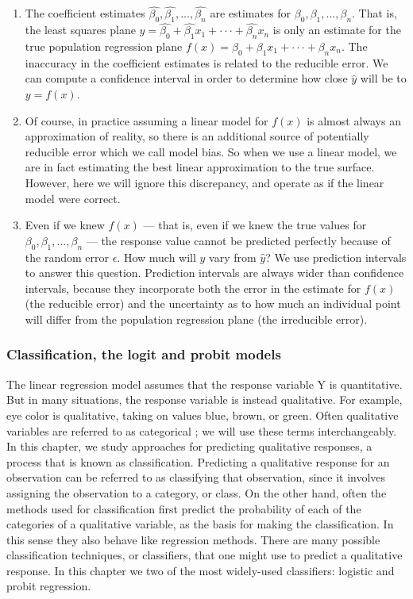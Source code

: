 \begin{enumerate}
    \item The coefficient estimates $\hat{\beta_0}, \hat{\beta_1}, ..., \hat{\beta_n}$ are estimates
for $\beta_0, \beta_1, ..., \beta_n$. That is, the least squares plane $\hat{y} = \hat{\beta_0} +
\hat{\beta_1} x_1 + ··· + \hat{\beta_n} x_n$ is only an estimate for the true population regression
plane $f(x) = \beta_0 + \beta_1 x_1 + ··· + \beta_n x_n$. The inaccuracy in the coefficient
estimates is related to the reducible error. We can compute a confidence interval in order to
determine how close $\hat{y}$ will be to $y = f(x)$.

    \item Of course, in practice assuming a linear model for $f(x)$ is almost always an
approximation of reality, so there is an additional source of potentially reducible error which we
call model bias. So when we use a linear model, we are in fact estimating the best linear
approximation to the true surface. However, here we will ignore this discrepancy, and operate as if
the linear model were correct.

    \item Even if we knew $f(x)$ --- that is, even if we knew the true values for $\beta_0, \beta_1,
..., \beta_n$ --- the response value cannot be predicted perfectly because of the random error
$\epsilon$. How much will $y$ vary from $\hat{y}$? We use prediction intervals to answer this
question. Prediction intervals are always wider than confidence intervals, because they incorporate
both the error in the estimate for $f(x)$ (the reducible error) and the uncertainty as to how much
an individual point will differ from the population regression plane (the irreducible error).
\end{enumerate}


\subsubsection{Classification, the logit and probit models}
The linear regression model assumes that the response variable Y is quantitative. But in many
situations, the response variable is instead qualitative. For example, eye color is qualitative,
taking on values blue, brown, or green. Often qualitative variables are referred to as categorical ;
we will use these terms interchangeably. In this chapter, we study approaches for predicting
qualitative responses, a process that is known as classification. Predicting a qualitative response
for an observation can be referred to as classifying that observation, since it involves assigning
the observation to a category, or class. On the other hand, often the methods used for
classification first predict the probability of each of the categories of a qualitative variable, as
the basis for making the classification. In this sense they also behave like regression methods.
There are many possible classification techniques, or classifiers, that one might use to predict a
qualitative response. In this chapter we two of the most widely-used classifiers: logistic and
probit regression.

